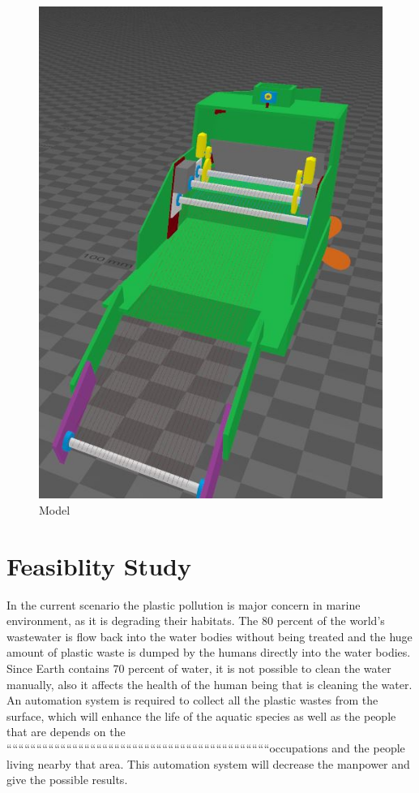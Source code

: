 \documentclass{article}
\begin{document}
\begin{figure}
	\includegraphics[width=\linewidth]{model.jpg}
	\caption{Model}
\end{figure}

\section{Feasiblity Study}
In the current scenario the plastic pollution is major concern in marine environment, as it is degrading their habitats. The 80 percent of the world’s wastewater is flow back into the water bodies without being treated and the huge amount of plastic waste is dumped by the humans directly into the water bodies. Since Earth contains 70 percent of water, it is not possible to clean the water manually, also it affects the health of the human being that is cleaning the water. An automation system is required to collect all the plastic wastes from the surface, which will enhance the life of the aquatic species as well as the people that are depends on the ````````````````````````````````````````````````````````````````````````````````````````occupations and the people living nearby that area. This automation system will decrease the manpower and give the possible results.
\end{document}
